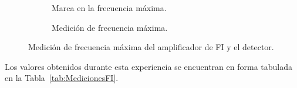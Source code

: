     \begin{figure}[H]
      \centering
      \begin{subfigure}[ht]{0.48\textwidth}
        \caption{Marca en la frecuencia máxima.}
        \label{fig:FrecuenciaMaxFI_Osc}
      \end{subfigure}
      \hfill 
      \begin{subfigure}[ht]{0.48\textwidth}
        \caption{Medición de frecuencia máxima.}
        \label{fig:FrecuneciaMaxFI_Gener}
      \end{subfigure}

      \caption{Medición de frecuencia máxima del amplificador de FI y el detector.}
      \label{fig:FrecuenciaMaxFI}
    \end{figure}

    Los valores obtenidos durante esta experiencia se encuentran en forma tabulada en la Tabla~\ref{tab:MedicionesFI}.

